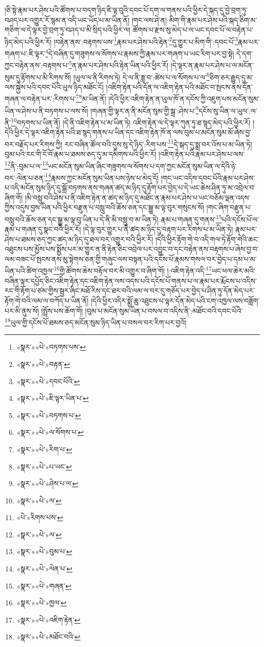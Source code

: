 །ཅི་སྟེ་རྣམ་པར་ཤེས་པའི་ཚོགས་པ་བདག་ཉིད་ཇི་ལྟ་བུའི་དབང་པོ་དག་ལ་གནས་པའི་ཕྱིར་དེ་སྐད་དུ་བྱེ་བྲག་ཏུ་བཤད་པར་འགྱུར་རོ་སྙམ་ན་འདི་ཡང་ཡོད་པ་མ་ཡིན་ནོ། །གང་ལས་ཤེ་ན། མིག་གི་རྣམ་པར་ཤེས་པའི་སྐད་ཅིག་མ་གཅིག་ལ་དེ་ལྟར་བྱེ་བྲག་ཏུ་བཤད་པ་མི་སྲིད་པའི་ཕྱིར་ལ། ཚོགས་པ་རྫས་སུ་མེད་པ་ལ་ཡང་དབང་པོ་ལ་བརྟེན་པ་ཉིད་མེད་པའི་ཕྱིར་རོ། །བརྟེན་ནས་:བརྟགས་པས་\footnote{«སྣར་»«པེ་»བཏགས་པས་}རྣམ་པར་ཤེས་པའི་རྟེན་\footnote{«སྣར་»«པེ་»བརྟན་}དུ་གྱུར་པ་མིག་གི་:དབང་པོ་\footnote{«སྣར་»«པེ་»དབང་པོའི་}རྣམ་པར་གཞག་པ་:ཇི་ལྟར་\footnote{«སྣར་»«པེ་»ཇི་ལྟར་ཡིན་པ་}དེ་བཞིན་དུ་གཟུགས་ལ་སོགས་པ་རྣམས་ཀྱི་རྣམ་པར་གཞག་པ་ཡང་རིག་པར་བྱ་སྟེ། དེ་དག་ཀྱང་བརྟེན་ནས་:བརྟགས་པ་\footnote{«སྣར་»«པེ་»བཏགས་པ་}ན་རྣམ་པར་ཤེས་པའི་རྟེན་ཡིན་པའི་ཕྱིར་རོ། །དེ་ལྟར་ན་རྣམ་པར་ཤེས་པ་ལ་མངོན་སུམ་དུ་རྟོགས་པ་མི་རིགས་སོ། །ཡུལ་ལ་ནི་རིགས་ཏེ། དེ་ལ་ནི་ཟླ་བ་:ཚེས་པ་ལ་སོགས་པ་ལ་\footnote{«སྣར་»«པེ་»ལ་སོགས་པ་}ཅིག་ཅར་རྒྱུད་དུ་མ་ལས་སྐྱེས་པའི་དབང་པོའི་ཡུལ་ཉིད་མཐོང་ངོ། །འཇིག་རྟེན་པའི་དོན་ལ་འཇིག་རྟེན་པའི་མཐོང་བ་སྤངས་ནས་དོན་གཞན་ལ་བརྟེན་པར་:རིགས་པ་\footnote{«སྣར་»«པེ་»རིག་པ་}\footnote{«སྣར་»«པེ་»པ་ཡང་}མ་ཡིན་ནོ། །དེའི་ཕྱིར་འཇིག་རྟེན་ན་ཡུལ་ཁོ་ན་དངོས་ཀྱི་འཇུག་པས་མངོན་སུམ་ཡིན་ལ་ཤེས་པ་ནི་བཏགས་པ་ལས་སོ། །གཞན་གྱི་ལྟར་ན་ནི་མངོན་སུམ་གྱི་སྒྲ་:ཤེས་པ་\footnote{«སྣར་»«པེ་»ཤེས་པ་ལ་}དངོས་སུ་ཡིན་ལ་ཡུལ་:ལ་ནི་\footnote{«སྣར་»«པེ་»ལ་}བཏགས་པ་ཡིན་ནོ། །དེ་ནི་འཇིག་རྟེན་པ་མ་ཡིན་ཏེ། འཇིག་རྟེན་ལ་དེ་ལྟར་ཀུན་ཏུ་ཐ་སྙད་མེད་པའི་ཕྱིར་རོ། །དེའི་ཕྱིར་དེ་ལྟར་འཇིག་རྟེན་པའི་ཐ་སྙད་གནས་པ་ཡིན་དང་འཇིག་རྟེན་ཁོ་ན་ལས་བུམ་པ་མངོན་སུམ་མོ་ཞེས་བྱ་བར་བརྗོད་པར་རིགས་ཀྱི། རང་བཞིན་ཚོལ་བའི་དུས་སུ་དེ་ཉིད་:རིག་པས་\footnote{«པེ་»རིགས་པས་}དེ་སྐད་དུ་སྨྲ་བར་འོས་པ་མ་ཡིན་ཏེ། བུམ་པའི་རང་གི་ངོ་བོ་རྣམ་པ་ཐམས་ཅད་དུ་མ་དམིགས་པའི་ཕྱིར་རོ། །འཇིག་རྟེན་པའི་རྣམ་པར་ཤེས་པ་ལས་\footnote{«སྣར་»«པེ་»ལ་}ནི་:བུམ་པ་ལ་\footnote{«སྣར་»«པེ་»བུམ་པ་}ཡང་མངོན་སུམ་ཡིན་ཞིང་གཟུགས་ལ་སོགས་པ་དག་ཀྱང་མངོན་སུམ་ཡིན་ལ་དེའི་ཉེ་བར་:ལེན་པ་ཅན་\footnote{«སྣར་»«པེ་»ལེན་པ་}རྣམས་ཀྱང་མངོན་སུམ་ཡིན་པས་ཉེས་པ་མེད་དོ། །གང་ཡང་འདིས་དབང་པོའི་རྣམ་པར་ཤེས་པ་འདི་མངོན་སུམ་ཉིད་དུ་སྒྲོ་བཏགས་ནས་གཞན་ཚད་མ་ཉིད་དུ་རྟོག་པར་བྱེད་པ་དེ་ཡང་ཆེས་ཤིན་ཏུ་མ་འབྲེལ་བ་ཞིག་གོ། །མི་བསླུ་བའི་ཤེས་པ་ནི་འཇིག་རྟེན་ན་ཚད་མ་ཉིད་དུ་མཐོང་ན་རྣམ་པར་ཤེས་པ་ཡང་བཅོམ་ལྡན་འདས་ཀྱིས་འདུས་བྱས་ཡིན་པའི་ཕྱིར་བརྫུན་པ་བསླུ་བའི་ཆོས་ཅན་དང་སྒྱུ་མ་ལྟ་བུར་གསུངས་སོ། །གང་ཞིག་བརྫུན་པ་བསླུ་བའི་ཆོས་ཅན་དང་སྒྱུ་མ་ལྟ་བུ་ཡིན་པ་དེ་ནི་མི་བསླུ་བ་མ་ཡིན་ཏེ། རྣམ་པ་གཞན་དུ་གནས་\footnote{«སྣར་»«པེ་»གཞན་}པའི་དངོས་པོ་ལ་རྣམ་པ་གཞན་དུ་སྣང་བའི་ཕྱིར་རོ། །དེ་ལྟ་བུར་གྱུར་པ་ནི་ཚད་མ་ཉིད་དུ་བརྟག་པར་རིགས་པ་མ་ཡིན་ཏེ། རྣམ་པར་ཤེས་པ་ཐམས་ཅད་ཀྱང་ཚད་མ་ཉིད་དུ་ཐལ་བར་འགྱུར་བའི་ཕྱིར་རོ། །དེའི་ཕྱིར་རྟོག་གེ་བ་འདི་གལ་ཏེ་རྟོག་གེའི་ཆང་འཐུངས་པས་མྱོས་པས་སྨྱོས་པར་མ་གྱུར་ན་ནི་རྟེན་ཅིང་འབྲེལ་པར་འབྱུང་བ་དང་བརྟེན་ནས་བརྟགས་པ་ཞེས་བྱ་བ་ལམ་བཟང་པོ་སྤངས་ནས་མུ་སྟེགས་ཅན་གྱི་གཞུང་ལས་བསྟན་པའི་དངོས་པོ་རྣམས་གསལ་བར་བྱེད་པ་དམ་པ་མ་ཡིན་པའི་ཚིག་འཁྱལ་\footnote{«སྣར་»«པེ་»ཁྱལ་}གྱི་ཚོགས་ཆེས་བརྟོལ་བར་མི་འགྱུར་བ་ཞིག་གོ། །:འཇིག་རྟེན་འདི་\footnote{«སྣར་»«པེ་»འཇིག་རྟེན་}ཡང་ཕལ་ཆེར་མའི་བཞིན་ལྟར་དཔྱོད་ཅིང་འཇིག་རྟེན་དང་འཇིག་རྟེན་ལས་འདས་པའི་དངོས་པོ་གནས་པ་ལ་རྣམ་པར་རྨོངས་པ་འདིས་རང་གི་རྟོག་པ་ཙམ་གྱིས་སྦྱར་ཞིང་མཐོ་རིས་དང་ཐར་བའི་ལམ་ལ་བར་དུ་གཅོད་པར་བྱེད་པ་ཤིན་ཏུ་དོན་མེད་པར་རྟོག་གེ་བའི་ལམ་ལ་བཀོད་པ་ཡིན་ནོ། །དེའི་ཕྱིར་འདིར་སྨྱོ་ཆུ་འཐུངས་པ་ལྟར་དོན་མེད་པའི་ངག་འཁྱལ་ལས་བཟློག་པར་མི་ནུས་སོ། །སྤྲོས་པས་ཆོག་གོ། །བུམ་པ་མངོན་སུམ་ཡིན་པ་བསལ་བ་འདིས་ནི་:མཐོང་བའི་དབང་པོའི་\footnote{«སྣར་»«པེ་»མཐོང་བའི་}ཡུལ་གྱི་དངོས་པོ་ཐམས་ཅད་མངོན་སུམ་ཉིད་ཡིན་པ་བསལ་བར་རིག་པར་བྱའོ། 